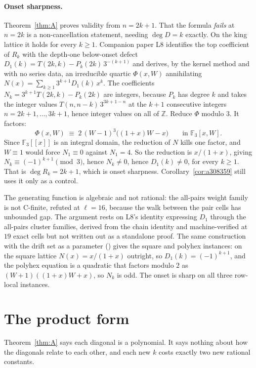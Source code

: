 \documentclass[11pt]{article}
\newcommand{\F}{\mathbb{F}}
\begin{document}
\paragraph{Onset sharpness.} Theorem~\ref{thm:A} proves validity from
$n = 2k+1$. That the formula \emph{fails} at $n = 2k$ is a non-cancellation
statement, needing $\deg D = k$ exactly. On the king lattice it holds for every
$k \ge 1$. Companion paper L8 identifies the top coefficient of $R_k$ with the
depth-one below-onset defect $D_1(k) = T(2k,k) - P_k(2k)\,3^{-(k+1)}$ and derives,
by the kernel method and with no series data, an irreducible quartic $\Phi(x,W)$
annihilating $N(x) = \sum_{k \ge 1} 3^{k+1} D_1(k)\,x^k$. The coefficients
$N_k = 3^{k+1}T(2k,k) - P_k(2k)$ are integers, because $P_k$ has degree $k$ and
takes the integer values $T(n,n-k)\,3^{3k+1-n}$ at the $k+1$ consecutive integers
$n = 2k+1, \dots, 3k+1$, hence integer values on all of $\mathbb{Z}$. Reduce
$\Phi$ modulo $3$. It factors:
\[
  \Phi(x,W) \;\equiv\; 2\,(W-1)^3\bigl((1+x)W - x\bigr)
  \qquad\text{in } \F_3[x,W].
\]
Since $\F_3[[x]]$ is an integral domain, the reduction of $N$ kills one factor,
and $W \equiv 1$ would force $N_1 \equiv 0$ against $N_1 = 4$. So the reduction
is $x/(1+x)$, giving $N_k \equiv (-1)^{k+1} \pmod 3$, hence $N_k \ne 0$, hence
$D_1(k) \ne 0$, for every $k \ge 1$. That is $\deg R_k = 2k+1$, which is onset
sharpness. Corollary~\ref{cor:a308359} still uses it only as a control.

The generating function is algebraic and not rational: the all-pairs weight
family is not C-finite, refuted at $\ell = 16$, because the walk between the pair
cells has unbounded gap. The argument rests on L8's identity expressing $D_1$
through the all-pairs cluster families, derived from the chain identity and
machine-verified at $19$ exact cells but not written out as a standalone proof.
The same construction with the drift set as a parameter
() gives the square and polyhex
instances: on the square lattice $N(x) = x/(1+x)$ outright, so
$D_1(k) = (-1)^{k+1}$, and the polyhex equation is a quadratic that factors
modulo $2$ as $(W+1)((1+x)W+x)$, so $N_k$ is odd. The onset is sharp on all
three row-local instances.

\section{The product form}
\label{sec:product}

Theorem~\ref{thm:A} says each diagonal is a polynomial. It says nothing about how
the diagonals relate to each other, and each new $k$ costs exactly two new
rational constants.
\end{document}
